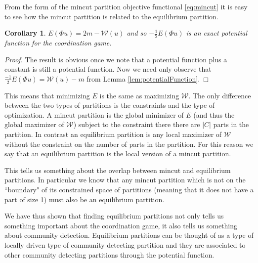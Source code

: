 \documentclass{article}
\newtheorem{corollary}{Corollary}[section]
\begin{document}

    From the form of the mincut partition objective functional \eqref{eq:mincut} it is easy to see how the mincut partition is related to the equilibrium partition. 
    \begin{corollary}\label{cor:mincutPotential}
        $E(\Phi u)= 2m-\mathcal{W}(u)$ and so $-\frac{1}{2}E(\Phi u)$ is an exact potential function for the coordination game.
    \end{corollary}

    \begin{proof}
        The result is obvious once we note that a potential function plus a constant is still a potential function. Now we need only observe that $\frac{-1}{2}E(\Phi u)=\mathcal{W}(u)-m$ from Lemma \ref{lem:potentialFunction}.
    \end{proof}

    This means that minimizing $E$ is the same as maximizing $\mathcal{W}$. The only difference between the two types of partitions is the constraints and the type of optimization. A mincut partition is the global minimizer of $E$ (and thus the global maximizer of $\mathcal{W}$) subject to the constraint there there are $|C|$ parts in the partition. In contrast an equilibrium partition is any local maximizer of $\mathcal{W}$ without the constraint on the number of parts in the partition. For this reason we say that an equilibrium partition is the local version of a mincut partition.  

    This tells us something about the overlap between mincut and equilibrium partitions. In particular we know that any mincut partition which is not on the ``boundary" of its constrained space of partitions (meaning that it does not have a part of size 1) must also be an equilibrium partition. 

    We have thus shown that finding equilibrium partitions not only tells us something important about the coordination game, it also tells us something about community detection. Equilibrium partitions can be thought of as a type of locally driven type of community detecting partition and they are associated to other community detecting partitions through the potential function. 
\end{document}

